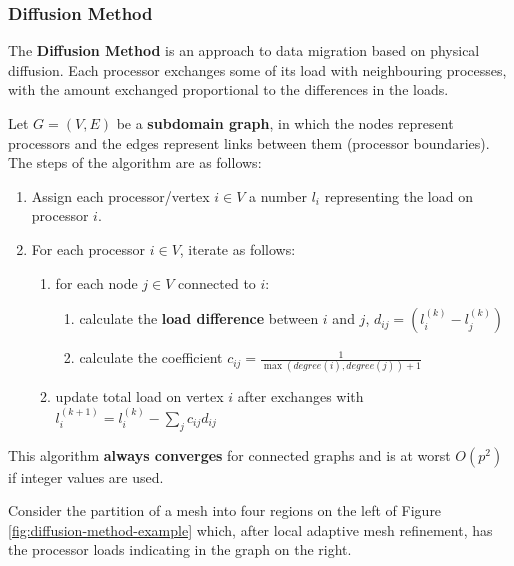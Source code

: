 \documentclass{article}
\begin{document}
\subsubsection{Diffusion Method}

The \textbf{Diffusion Method} is an approach to data migration based on physical diffusion. Each processor exchanges some of its load with neighbouring processes, with the amount exchanged proportional to the differences in the loads.

Let $G = (V, E)$ be a \textbf{subdomain graph}, in which the nodes represent processors and the edges represent links between them (processor boundaries). The steps of the algorithm are as follows:
\begin{enumerate}
	\item Assign each processor/vertex $i \in V$ a number $l_i$ representing the load on processor $i$.
	 \item For each processor $i \in V$, iterate as follows:
	 \begin{enumerate}
	 	\item for each node $j \in V$ connected to $i$:
	 		\begin{enumerate}
	 			\item calculate the \textbf{load difference} between $i$ and $j$, $d_{ij} = (l_i^{(k)} - l_j^{(k)})$
	 			\item calculate the coefficient $c_{ij} = \frac{1}{\max (degree(i), degree(j)) + 1}$
	 		\end{enumerate}
	 	\item update total load on vertex $i$ after exchanges with $l_i^{(k+1)} = l_i^{(k)} - \sum_j {c_{ij}d_{ij}}$
	 \end{enumerate}
\end{enumerate}
This algorithm \textbf{always converges} for connected graphs and is at worst $O(p^2)$ if integer values are used.

Consider the partition of a mesh into four regions on the left of Figure \ref{fig:diffusion-method-example} which, after local adaptive mesh refinement, has the processor loads indicating in the graph on the right.
\end{document}
